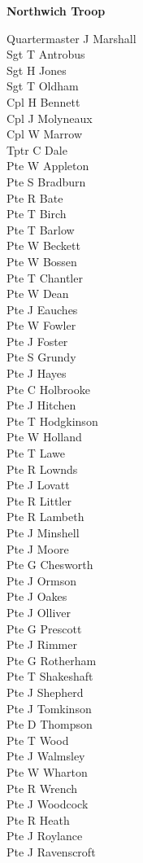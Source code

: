 \begin{center}
  \Large
  \textbf{Northwich Troop}
\end{center}

\begin{multicols}{2}
  \noindent
  Quartermaster J Marshall \\
  Sgt T Antrobus \\
  Sgt H Jones \\
  Sgt T Oldham \\
  Cpl H Bennett \\
  Cpl J Molyneaux \\
  Cpl W Marrow \\
  Tptr C Dale \\
  Pte W Appleton \\
  Pte S Bradburn \\
  Pte R Bate \\
  Pte T Birch \\
  Pte T Barlow \\
  Pte W Beckett \\
  Pte W Bossen \\
  Pte T Chantler \\
  Pte W Dean \\
  Pte J Eauches \\
  Pte W Fowler \\
  Pte J Foster \\
  Pte S Grundy \\
  Pte J Hayes \\
  Pte C Holbrooke \\
  Pte J Hitchen \\
  Pte T Hodgkinson \\
  Pte W Holland \\
  Pte T Lawe \\
  Pte R Lownds \\
  Pte J Lovatt \\
  Pte R Littler \\
  Pte R Lambeth \\
  Pte J Minshell \\
  Pte J Moore \\
  Pte G Chesworth \\
  Pte J Ormson \\
  Pte J Oakes \\
  Pte J Olliver \\
  Pte G Prescott \\
  Pte J Rimmer \\
  Pte G Rotherham \\
  Pte T Shakeshaft \\
  Pte J Shepherd \\
  Pte J Tomkinson \\
  Pte D Thompson \\
  Pte T Wood \\
  Pte J Walmsley \\
  Pte W Wharton \\
  Pte R Wrench \\
  Pte J Woodcock \\
  Pte R Heath \\
  Pte J Roylance \\
  Pte J Ravenscroft \\
\end{multicols}
